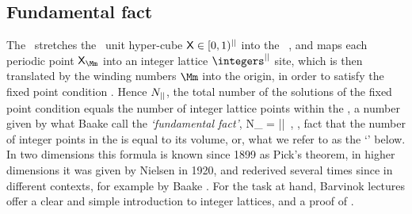 \subsection{Fundamental fact} %
\label{sect:fundFact}

The {\jacobianOrb} \jMorb\ stretches the \statesp\ unit hyper-cube
$\mathsf{X}\in[0,1)^{||}$ into the \cl{}\dmn\ {\em \fundPip}, and maps each
periodic point ${\Xx}_{\Mm}$ into an integer lattice $\integers^\cl{}$
site, which is then translated by the winding numbers $\Mm$ into the
origin, in order to satisfy the fixed point condition
. Hence $N_{||}$, the total number of the solutions
of the fixed point condition equals the number of integer lattice points
within the {\fundPip}, a number given by what Baake \etal{}
call the \emph{`fundamental fact'},
\beq
N_\cl{} = |\Det\jMorb|
\,,
\ie, fact that the number of integer points in the {\fundPip} is equal to
its volume, or, what we refer to as the `{\HillDet}' below. In two
dimensions this formula is known since 1899 as
 {Pick's theorem},
in higher dimensions it was given by Nielsen in
1920, and rederived several times since in different contexts, for
example by Baake \etal{}. For the task at hand,
Barvinok
 {lectures}
offer a clear and simple introduction to integer lattices, and a proof of
.

